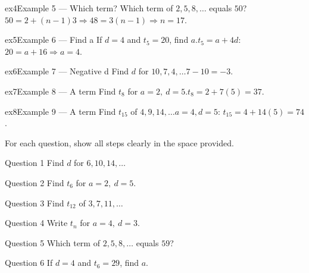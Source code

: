 \documentclass[11pt]{article}
\begin{document}
\begin{example}{ex4}{Example 5 --- Which term?}
Which term of $2,5,8,\dots$ equals $50$?\soln $50=2+(n-1)3\Rightarrow 48=3(n-1)\Rightarrow n=17$.
\end{example}

\begin{example}{ex5}{Example 6 --- Find a}
If $d=4$ and $t_5=20$, find $a$.\soln $t_5=a+4d$: $20=a+16\Rightarrow a=4$.
\end{example}

\begin{example}{ex6}{Example 7 --- Negative d}
Find $d$ for $10,7,4,\dots$\soln $7-10=-3$.
\end{example}

\begin{example}{ex7}{Example 8 --- A term}
Find $t_8$ for $a=2,\ d=5$.\soln $t_8=2+7(5)=37$.
\end{example}

\begin{example}{ex8}{Example 9 --- A term}
Find $t_{15}$ of $4,9,14,\dots$\soln $a=4,d=5$: $t_{15}=4+14(5)=74$.
\end{example}

\clearpage
{}
For each question, show all steps clearly in the space provided.

\begin{qbox}{Question 1}
Find $d$ for $6,10,14,\dots$\workspace{2.4cm}
\end{qbox}

\begin{qbox}{Question 2}
Find $t_6$ for $a=2,\ d=5$.\workspace{2.4cm}
\end{qbox}

\begin{qbox}{Question 3}
Find $t_{12}$ of $3,7,11,\dots$\workspace{2.4cm}
\end{qbox}

\begin{qbox}{Question 4}
Write $t_n$ for $a=4,\ d=3$.\workspace{2.4cm}
\end{qbox}

\begin{qbox}{Question 5}
Which term of $2,5,8,\dots$ equals $59$?\workspace{2.4cm}
\end{qbox}

\begin{qbox}{Question 6}
If $d=4$ and $t_6=29$, find $a$.\workspace{2.4cm}
\end{qbox}
\end{document}
